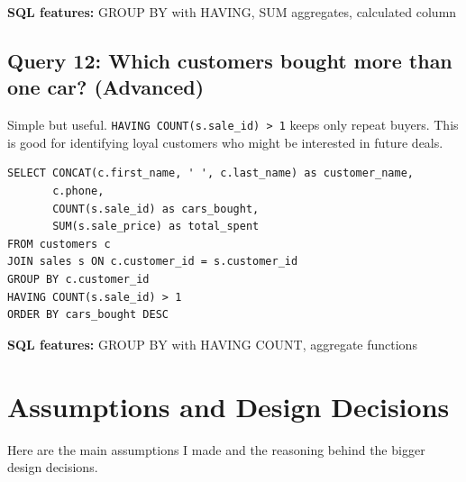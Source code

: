 \documentclass[12pt]{article}
\begin{document}
\textbf{SQL features:} GROUP BY with HAVING, SUM aggregates, calculated column

\subsection{Query 12: Which customers bought more than one car? (Advanced)}

Simple but useful. \texttt{HAVING COUNT(s.sale\_id) > 1} keeps only repeat buyers. This is good for identifying loyal customers who might be interested in future deals.

\begin{lstlisting}[style=sql]
SELECT CONCAT(c.first_name, ' ', c.last_name) as customer_name,
       c.phone,
       COUNT(s.sale_id) as cars_bought,
       SUM(s.sale_price) as total_spent
FROM customers c
JOIN sales s ON c.customer_id = s.customer_id
GROUP BY c.customer_id
HAVING COUNT(s.sale_id) > 1
ORDER BY cars_bought DESC
\end{lstlisting}

\textbf{SQL features:} GROUP BY with HAVING COUNT, aggregate functions

\section{Assumptions and Design Decisions}

Here are the main assumptions I made and the reasoning behind the bigger design decisions.
\end{document}
